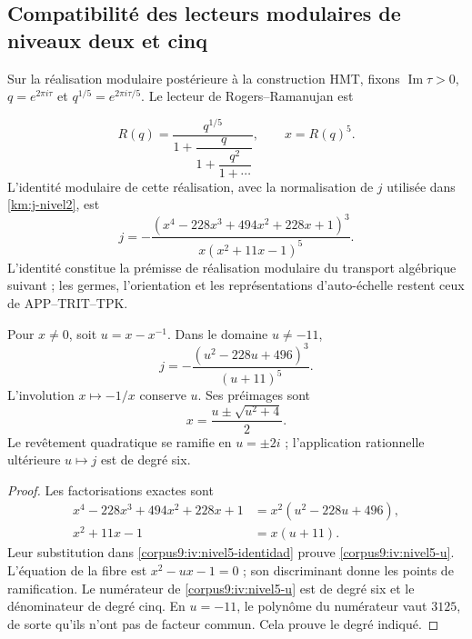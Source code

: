 \subsection{Compatibilité des lecteurs modulaires de niveaux deux et cinq}
\label{corpus9:iv:niveles}

Sur la réalisation modulaire postérieure à la construction HMT,
fixons \(\operatorname{Im}\tau>0\), \(q=e^{2\pi i\tau}\) et
\(q^{1/5}=e^{2\pi i\tau/5}\). Le lecteur de Rogers--Ramanujan est

\[
 R(q)=\frac{q^{1/5}}{1+\dfrac{q}{1+\dfrac{q^2}{1+\cdots}}},
 \qquad x=R(q)^5.
\]
L’identité modulaire de cette réalisation, avec la normalisation
de \(j\) utilisée dans \eqref{km:j-nivel2}, est
\begin{equation}
 j=-\frac{(x^4-228x^3+494x^2+228x+1)^3}
          {x(x^2+11x-1)^5}.
 \label{corpus9:iv:nivel5-identidad}
\end{equation}
L’identité constitue la prémisse de réalisation modulaire du
transport algébrique suivant ; les germes, l’orientation et
les représentations d’auto-échelle restent ceux de APP--TRIT--TPK.

\begin{proposition}
\label{corpus9:iv:nivel5-cociente}
Pour \(x\ne0\), soit \(u=x-x^{-1}\). Dans le domaine \(u\ne-11\),
\begin{equation}
 j=-\frac{(u^2-228u+496)^3}{(u+11)^5}.
 \label{corpus9:iv:nivel5-u}
\end{equation}
L’involution \(x\mapsto-1/x\) conserve \(u\). Ses préimages sont
\[
 x=\frac{u\pm\sqrt{u^2+4}}2.
\]
Le revêtement quadratique se ramifie en \(u=\pm2i\) ; l’application
rationnelle ultérieure \(u\mapsto j\) est de degré six.
\end{proposition}
\begin{proof}
Les factorisations exactes sont
\[
 \begin{aligned}
 x^4-228x^3+494x^2+228x+1
   &=x^2(u^2-228u+496),\\
 x^2+11x-1&=x(u+11).
 \end{aligned}
\]
Leur substitution dans \eqref{corpus9:iv:nivel5-identidad} prouve
\eqref{corpus9:iv:nivel5-u}. L’équation de la fibre est
\(x^2-ux-1=0\) ; son discriminant donne les points de ramification.
Le numérateur de \eqref{corpus9:iv:nivel5-u} est de degré six
et le dénominateur de degré cinq. En \(u=-11\), le polynôme
du numérateur vaut \(3125\), de sorte qu’ils n’ont pas de
facteur commun. Cela prouve le degré indiqué.
\end{proof}


